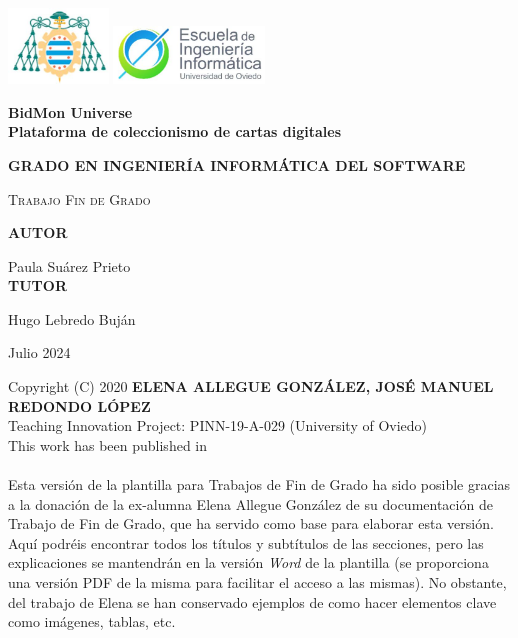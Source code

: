 \documentclass[11pt]{report}
\begin{document}

\hypersetup{pageanchor=false}
\begin{titlepage}
	\centering
	\includegraphics[width=0.2\textwidth]{EscudoUniovi}
	\hspace{3 cm}
	\includegraphics[width=0.3\textwidth]{EscudoEscuela}
	\par\vspace{1cm}
	
	\vspace{1.5cm}
	{\huge\bfseries BidMon Universe \\ Plataforma de coleccionismo de cartas digitales\par}
	\vspace{2cm}
	{\large \textbf{GRADO EN INGENIERÍA INFORMÁTICA DEL SOFTWARE} \par}
	\vspace{1cm}
	{\scshape\Large Trabajo Fin de Grado\par}
   	
  \vspace{2cm}
	\textbf{AUTOR}\par
	Paula Suárez Prieto \\
	\vspace{1.5cm}
	\textbf{TUTOR}\par
	Hugo Lebredo Buján
	\vfill
	
	{\large Julio 2024 \par}
\end{titlepage}


\newpage
\pagestyle{plain}
Copyright (C) 2020 \textbf{ELENA ALLEGUE GONZÁLEZ, JOSÉ MANUEL REDONDO LÓPEZ} \\
Teaching Innovation Project: PINN-19-A-029 (University of Oviedo)\\
This work has been published in \cite{RedondoPlantillasRG19} \cite{RedondoUCO20}\\
\\
Esta versión de la plantilla para Trabajos de Fin de Grado ha sido posible gracias a la donación de la ex-alumna Elena Allegue González de su documentación de Trabajo de Fin de Grado, que ha servido como base para elaborar esta versión. Aquí podréis encontrar todos los títulos y subtítulos de las secciones, pero las explicaciones se mantendrán en la versión \textit{Word} de la plantilla (se proporciona una versión PDF de la misma para facilitar el acceso a las mismas). No obstante, del trabajo de Elena se han conservado ejemplos de como hacer elementos clave como imágenes, tablas, etc.
\end{document}
